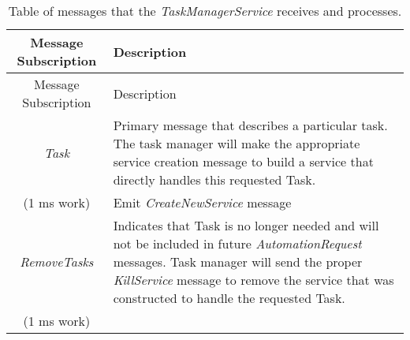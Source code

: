 \begin{longtable}[]{@{}cl@{}}
\caption{Table of messages that the \emph{TaskManagerService} receives
and processes.}\tabularnewline
\toprule
\begin{minipage}[b]{0.40\columnwidth}\centering\strut
Message Subscription\strut
\end{minipage} & \begin{minipage}[b]{0.55\columnwidth}\raggedright\strut
Description\strut
\end{minipage}\tabularnewline
\midrule
\endfirsthead
\toprule
\begin{minipage}[b]{0.40\columnwidth}\centering\strut
Message Subscription\strut
\end{minipage} & \begin{minipage}[b]{0.55\columnwidth}\raggedright\strut
Description\strut
\end{minipage}\tabularnewline
\midrule
\endhead
\begin{minipage}[t]{0.40\columnwidth}\centering\strut
\emph{Task}\strut
\end{minipage} & \begin{minipage}[t]{0.55\columnwidth}\raggedright\strut
Primary message that describes a particular task. The task manager will
make the appropriate service creation message to build a service that
directly handles this requested Task.\strut
\end{minipage}\tabularnewline
\begin{minipage}[t]{0.40\columnwidth}\centering\strut
(1 ms work)\strut
\end{minipage} & \begin{minipage}[t]{0.55\columnwidth}\raggedright\strut
Emit \emph{CreateNewService} message\strut
\end{minipage}\tabularnewline
\begin{minipage}[t]{0.40\columnwidth}\centering\strut
\emph{RemoveTasks}\strut
\end{minipage} & \begin{minipage}[t]{0.55\columnwidth}\raggedright\strut
Indicates that Task is no longer needed and will not be included in
future \emph{AutomationRequest} messages. Task manager will send the
proper \emph{KillService} message to remove the service that was
constructed to handle the requested Task.\strut
\end{minipage}\tabularnewline
\begin{minipage}[t]{0.40\columnwidth}\centering\strut
(1 ms work)\strut
\end{minipage} & \begin{minipage}[t]{0.55\columnwidth}\raggedright\strut

\end{minipage}
\end{longtable}
